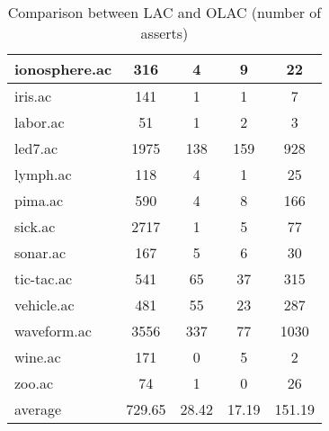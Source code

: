 \begin{table}[htbp]
\begin{tabular}{|l|c|c|c|c|}
		\hline
		ionosphere.ac   & 316           & 4                  & 9                        & 22                            \\
		\hline
		iris.ac         & 141           & 1                  & 1                        & 7                             \\
		\hline
		labor.ac        & 51            & 1                  & 2                        & 3                             \\
		\hline
		led7.ac         & 1975          & 138                & 159                      & 928                           \\
		\hline
		lymph.ac        & 118           & 4                  & 1                        & 25                            \\
		\hline
		pima.ac         & 590           & 4                  & 8                        & 166                           \\
		\hline
		sick.ac         & 2717          & 1                  & 5                        & 77                            \\
		\hline
		sonar.ac        & 167           & 5                  & 6                        & 30                            \\
		\hline
		tic-tac.ac      & 541           & 65                 & 37                       & 315                           \\
		\hline
		vehicle.ac      & 481           & 55                 & 23                       & 287                           \\
		\hline
		waveform.ac     & 3556          & 337                & 77                       & 1030                          \\
		\hline
		wine.ac         & 171           & 0                  & 5                        & 2                             \\
		\hline
		zoo.ac          & 74            & 1                  & 0                        & 26                            \\
		\hline
		average         & 729.65        & 28.42              & 17.19                    & 151.19                        \\
		\hline
		\end{tabular}
	\caption{Comparison between LAC and OLAC (number of asserts)}
	\label{tab:comparison_lac_olac}
\end{table}